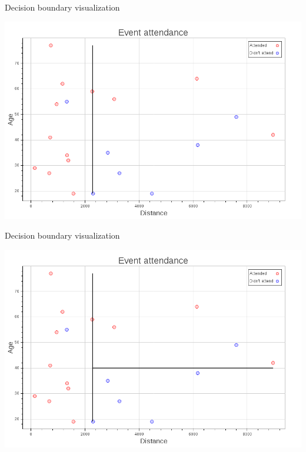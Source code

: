 \begin{frame}[fragile]{Decision boundary visualization}
    \begin{center}
        \includegraphics[scale=.25]{images/decision_tree_plot_1}
    \end{center}
\end{frame}

\begin{frame}[fragile]{Decision boundary visualization}
    \begin{center}
        \includegraphics[scale=.25]{images/decision_tree_plot_2}
    \end{center}
\end{frame}


